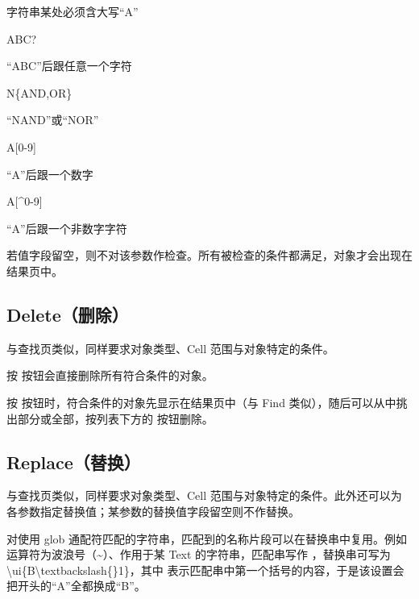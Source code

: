 字符串某处必须含大写“A”

\begin{kldesc}
\item ABC?
\end{kldesc}

“ABC”后跟任意一个字符

\begin{kldesc}
\item N\{AND,OR\}
\end{kldesc}

“NAND”或“NOR”

\begin{kldesc}
\item A[0-9]
\end{kldesc}

“A”后跟一个数字

\begin{kldesc}
\item A[\textasciicircum{}0-9]
\end{kldesc}

“A”后跟一个非数字字符

若值字段留空，则不对该参数作检查。所有被检查的条件都满足，对象才会出现在结果页中。

\subsection{Delete（删除）}

与查找页类似，同样要求对象类型、Cell 范围与对象特定的条件。

按  按钮会直接删除所有符合条件的对象。

按  按钮时，符合条件的对象先显示在结果页中（与 Find 类似），随后可以从中挑出部分或全部，按列表下方的  按钮删除。

\subsection{Replace（替换）}

与查找页类似，同样要求对象类型、Cell 范围与对象特定的条件。此外还可以为各参数指定替换值；某参数的替换值字段留空则不作替换。

对使用 glob 通配符匹配的字符串，匹配到的名称片段可以在替换串中复用。例如运算符为波浪号（\textasciitilde{}）、作用于某 Text 的字符串，匹配串写作 ，替换串可写为 \textbackslash{}ui\{B\textbackslash{}textbackslash\{\}1\}，其中  表示匹配串中第一个括号的内容，于是该设置会把开头的“A”全都换成“B”。

